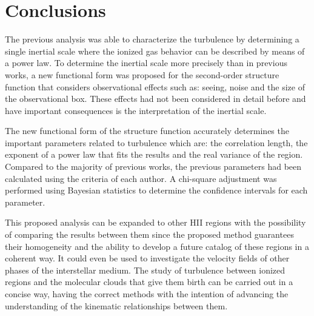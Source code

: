 \documentclass[fleqn,usenatbib, useAMS, a4paper]{mnras}
\begin{document}

\section{Conclusions}\label{sec:conclusions}

The previous analysis was able to characterize the turbulence by determining a single inertial scale where the ionized gas behavior can be described by means of a power law.
To determine the inertial scale more precisely than in previous works, a new functional form was proposed for the second-order structure function that considers observational effects such as: seeing, noise and the size of the observational box.
These effects had not been considered in detail before and have important consequences is the interpretation of the inertial scale.

The new functional form of the structure function accurately determines the important parameters related to turbulence which are: the correlation length, the exponent of a power law that fits the results and the real variance of the region.
Compared to the majority of previous works, the previous parameters had been calculated using the criteria of each author.
A chi-square adjustment was performed using Bayesian statistics to determine the confidence intervals for each parameter.

This proposed analysis can be expanded to other HII regions with the possibility of comparing the results between them since the proposed method guarantees their homogeneity and the ability to develop a future catalog of these regions in a coherent way.
It could even be used to investigate the velocity fields of other phases of the interstellar medium.
The study of turbulence between ionized regions and the molecular clouds that give them birth can be carried out in a concise way, having the correct methods with the intention of advancing the understanding of the kinematic relationships between them.
\end{document}
